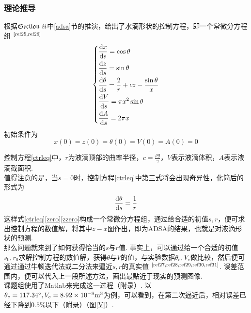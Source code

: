 \documentclass[a4paper,12pt]{article}%
\newcommand{\suo}{\indent}%
\begin{document}
\subsubsection{理论推导}
根据$\mathfrak{Section}~\uppercase\expandafter{\romannumeral2}$中\ref{adsa}节的推演，给出了水滴形状的控制方程，即一个常微分方程组
$^\text{\cite{ref25,ref26}}$
\begin{equation}\label{ctrleq}
    \left\{
        \begin{aligned}
            &\frac{\text dx}{\text ds}=\cos\theta\\%
            &\frac{\text dz}{\text ds}=\sin\theta\\%
            &\frac{\text d\theta}{\text ds}=\frac{2}{r}+cz-\frac{\sin\theta}{x}\\
            &\frac{\text dV}{\text ds}=\pi x^2\sin\theta\\
            &\frac{\text dA}{\text ds}=2\pi x
        \end{aligned}
    \right.
\end{equation}
初始条件为
\begin{equation}
    x(0)=z(0)=\theta(0)=V(0)=A(0)=0\label{zero}
\end{equation}
\begin{spacing}{1.528}%
控制方程\eqref{ctrleq}中，$r$为液滴顶部的曲率半径，$c=\frac{\rho g}{\gamma}$，$V$表示液滴体积，$A$表示液滴截面积. 
\\\suo 值得注意的是，当$s=0$时，控制方程\eqref{ctrleq}中第三式将会出现奇异性，化简后的形式为
\begin{equation}
    \frac{\text d\theta}{\text ds}=\frac{1}{r}\label{zzero}
\end{equation}
这样式\eqref{ctrleq}\eqref{zero}\eqref{zzero}构成一个常微分方程组，通过给合适的初值$s,r$，便可求出控制方程的数值解，将其中$z-x$图作出，即为ADSA的结果，也就是对液滴形状的预测. 
\\\suo 那么问题就来到了如何获得恰当的$s$与$r$值. 事实上，可以通过给一个合适的初值$s_0,r_0$求解控制方程的数值解，获得$\theta$与$V$的值，与实验数据$\theta_e,V_e$做比较，然后便可通过通过牛顿迭代法或二分法来逼近$s,r$的真实值
$^\text{\cite{ref27,ref28,ref29,ref30,ref31}}$. 
误差范围内，便可以代入上一段所述方法，画出最贴近于现实的预测图像. 
\\\suo 课题组使用了Matlab来完成这一过程（附录）. 以$\theta_e = 117.34\degree,V_e = 8.92\times10^{-8}\text m^3$为例，可以看到，在第二次逼近后，相对误差已经下降到$0.5\%$以下（附录）（图\ref{V}）. 
\end{spacing}
\end{document}
